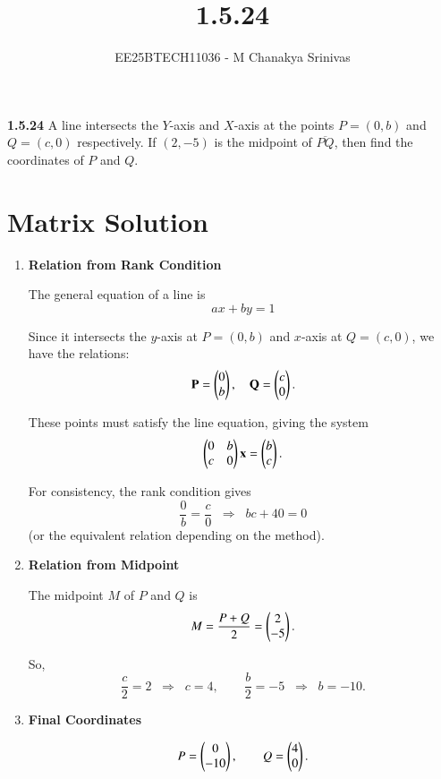\documentclass[journal]{IEEEtran}
\begin{document}
	
	
	\vspace{3cm}
	
	\title{1.5.24}
	\author{EE25BTECH11036 - M Chanakya Srinivas}
	\maketitle
	{\let\newpage\relax\maketitle}
	
	\renewcommand{\thefigure}{\theenumi}
	\renewcommand{\thetable}{\theenumi}
	\setlength{\intextsep}{10pt} %
	
	
	\renewcommand{\thetable}{\theenumi}

\textbf{1.5.24}\quad
A line intersects the $Y$-axis and $X$-axis at the points
$P=(0,b)$ and $Q=(c,0)$ respectively. If $(2,-5)$ is the midpoint of
$\overline{PQ}$, then find the coordinates of $P$ and $Q$.

\section*{Matrix Solution}

\begin{enumerate}
\item \textbf{Relation from Rank Condition}

The general equation of a line is
\[
ax + by = 1
\]

Since it intersects the $y$-axis at $P=(0,b)$ and $x$-axis at $Q=(c,0)$,  
we have the relations:
\[
\mathbf{P} = \begin{pmatrix}0 \\ b\end{pmatrix}, \quad \mathbf{Q} = \begin{pmatrix}c \\ 0\end{pmatrix}.
\]

These points must satisfy the line equation, giving the system
\[
\begin{pmatrix}0 & b \\ c & 0\end{pmatrix}\mathbf{x} = \begin{pmatrix}b \\ c\end{pmatrix}.
\]

For consistency, the rank condition gives
\[
\frac{0}{b} = \frac{c}{0} \;\;\Rightarrow\;\; bc + 40 = 0
\]
(or the equivalent relation depending on the method).

\item \textbf{Relation from Midpoint}

The midpoint $M$ of $P$ and $Q$ is
\[
M = \frac{P+Q}{2} = \begin{pmatrix}2 \\ -5\end{pmatrix}.
\]

So,
\[
\frac{c}{2} = 2 \;\;\Rightarrow\;\; c=4, 
\qquad 
\frac{b}{2} = -5 \;\;\Rightarrow\;\; b=-10.
\]

\item \textbf{Final Coordinates}

\[
P = \begin{pmatrix}0 \\ -10\end{pmatrix}, 
\qquad 
Q = \begin{pmatrix}4 \\ 0\end{pmatrix}.
\]

\end{enumerate}
\end{document}
